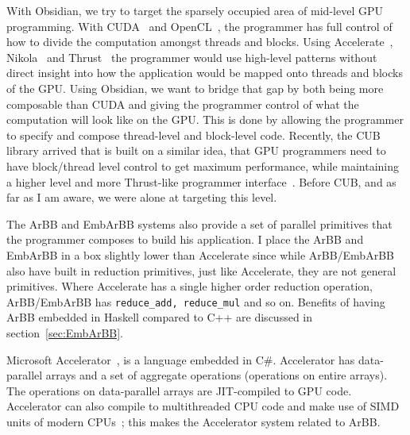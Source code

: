 \documentclass[a4paper]{book}
\begin{document}
With Obsidian, we try to target the sparsely occupied area of mid-level GPU programming. With 
CUDA~\citet{wwwcuda} and OpenCL~\citet{OpenCL}, the programmer has full control of how to divide 
the computation amongst threads and blocks. Using Accelerate~\citet{ACCELERATEDAMP11}, 
Nikola~\citet{NIKOLA} 
and Thrust~\citet{THRUST} the programmer would use 
high-level patterns without direct insight into how the application would be mapped onto 
threads and blocks of the GPU. Using Obsidian, we want to bridge that gap by both being 
more composable than CUDA and giving the programmer control of what the computation will 
look like on the GPU. This is done by allowing the programmer to specify and compose 
thread-level and block-level code. Recently, the CUB library arrived that is built on a 
similar idea, that GPU programmers need to have block/thread level control to get maximum 
performance, while maintaining a higher level and more Thrust-like programmer 
interface~\citet{CUB}. Before CUB, and as far as I am aware, we were alone at targeting 
this level.  

The ArBB and EmbArBB systems also provide a set of parallel primitives that the programmer
composes to build his application. I place the ArBB and EmbArBB in a box slightly lower than 
Accelerate since while ArBB/EmbArBB also have built in reduction primitives, just like Accelerate, 
they are not general primitives. Where Accelerate has a single higher order reduction 
operation, ArBB/EmbArBB has {\tt reduce\_add, reduce\_mul} and so on. Benefits of 
having ArBB embedded in Haskell compared to C++ are discussed in section~\ref{sec:EmbArBB}.

Microsoft Accelerator~\citet{ACCELERATOR}, is a language embedded in C\#. Accelerator has
data-parallel arrays and a set of aggregate operations (operations on entire arrays). The 
operations on data-parallel arrays are JIT-compiled to GPU code. Accelerator can also 
compile to multithreaded CPU code and make use of SIMD units of modern 
CPUs~\citet{ACCELERATORCPU}; this makes the Accelerator system related to ArBB. 
\end{document}
